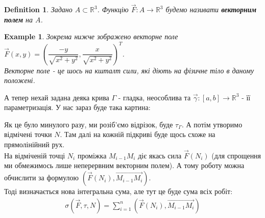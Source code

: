 \documentclass[a4paper, 10pt]{article}
\theoremstyle{theoremdd}
\theoremstyle{theoremdd}
\newtheorem{definition}[theorem]{Definition}
\theoremstyle{theoremdd}
\theoremstyle{theoremdd}
\theoremstyle{theoremdd}
\newtheorem{example}[theorem]{Example}
\theoremstyle{theoremdd}
\theoremstyle{theoremdd}
\theoremstyle{theoremdd}
\theoremstyle{theoremdd}
\theoremstyle{theoremdd}
\theoremstyle{theoremdd}
\theoremstyle{theoremdd}
\theoremstyle{theoremdd}
\theoremstyle{theoremdd}
\theoremstyle{theoremdd}
\begin{document}
\begin{definition}
Задано $A \subset \mathbb{R}^3$. Функцію $\vec{F}: A \to \mathbb{R}^3$ будемо називати \textbf{векторним полем} на $A$.
\end{definition}

\begin{example}
Зокрема нижче зображено векторне поле $\vec{F}(x,y) = \left( \dfrac{-y}{\sqrt{x^2+y^2}}, \dfrac{x}{\sqrt{x^2+y^2}} \right)^T$.\\
Векторне поле - це шось на кшталт \textit{сили}, які діють на фізичне тіло в даному положені.
\end{example}

\begin{figure}[H]
\centering
{}
\end{figure}

А тепер нехай задана деяка крива $\Gamma$ - гладка, неособлива та $\vec{\gamma}: [a,b] \to \mathbb{R}^3$ - її параметризація. У нас зараз буде така картина:

\begin{figure}[H]
\centering
{}
\end{figure}
Як це було минулого разу, ми розіб'ємо відрізок, буде $\tau_\Gamma$. А потім утворимо відмічені точки $N$. Там далі на кожній підкриві буде щось схоже на прямолінійний рух.\\
На відміченій точці $N_i$ проміжка $M_{i-1}M_i$ діє якась сила $\vec{F}(N_i)$ (для спрощення ми обмежимось лише неперервним векторним полем). А тому роботу можна обчислити за формулою $( \vec{F}(N_i), \overrightarrow{M_{i-1}M_i} )$.\\
Тоді визначається нова інтегральна сума, але тут це буде сума всіх робіт:
\begin{align*}
\sigma(\vec{F},\tau,N) = \displaystyle\sum_{i=1}^n \left( \vec{F}(N_i), \overrightarrow{M_{i-1}M_i} \right)
\end{align*}
\end{document}
